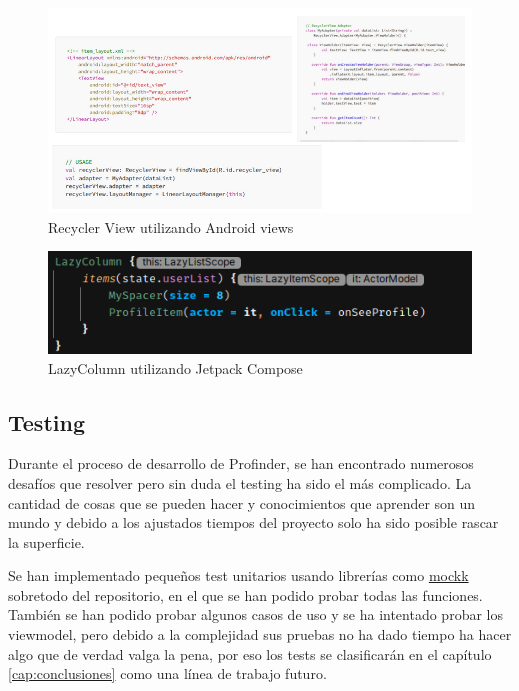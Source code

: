 \begin{figure}[h]
	\centering
	\includegraphics[width = 1\textwidth]{Imagenes/Fuentes/views_demo.png}
	\caption{Recycler View utilizando Android views \citep{RecyclerVsLazy}}
	\label{fig:views_demo}
\end{figure}
\newpage
\begin{figure}[h]
	\centering
	\includegraphics[width = 1\textwidth]{Imagenes/Fuentes/compose_demo.png}
	\caption{LazyColumn utilizando Jetpack Compose}
	\label{fig:compose_demo}
\end{figure}

\subsection{Testing}
\label{subsec:testing}
Durante el proceso de desarrollo de Profinder, se han encontrado numerosos desafíos que resolver pero sin duda el testing ha sido el más complicado. La cantidad de cosas que se pueden hacer y conocimientos que aprender son un mundo y debido a los ajustados tiempos del proyecto solo ha sido posible rascar la superficie.

Se han implementado pequeños test unitarios usando librerías como \href{https://mockk.io/ANDROID.html}{mockk} sobretodo del repositorio, en el que se han podido probar todas las funciones. También se han podido probar algunos casos de uso y se ha intentado probar los viewmodel, pero debido a la complejidad sus pruebas no ha dado tiempo ha hacer algo que de verdad valga la pena, por eso los tests se clasificarán en el capítulo \ref{cap:conclusiones} como una línea de trabajo futuro.

